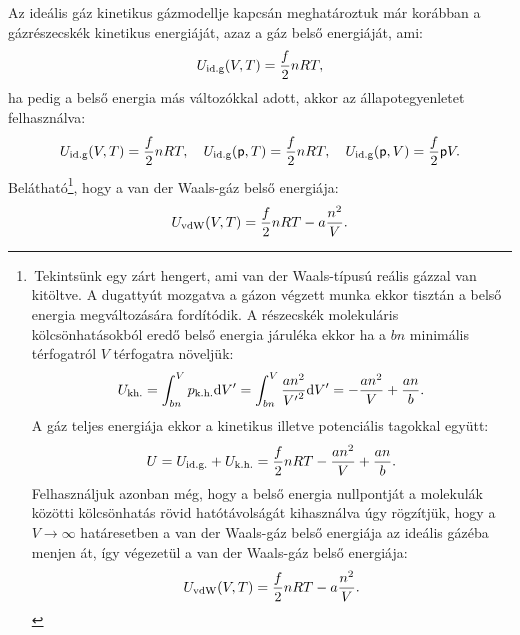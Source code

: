 Az ideális gáz kinetikus gázmodellje kapcsán meghatároztuk már korábban a gázrészecskék kinetikus energiáját, azaz a gáz belső energiáját, ami:
\begin{align}
    U_{\textnormal{id.g}}(V,T) = \frac f2 nRT,
\end{align}
ha pedig a belső energia más változókkal adott, akkor az állapotegyenletet felhasználva:
\begin{align}
    U_{\textnormal{id.g}}(V,T) = \frac f2 nRT,\quad U_{\textnormal{id.g}}(\mathsf p,T) = \frac f2 nRT,\quad  U_{\textnormal{id.g}}(\mathsf p,V) = \frac f2 \mathsf p V.
\end{align}
Belátható\footnote{\,Tekintsünk egy zárt hengert, ami van der Waals-típusú reális gázzal van kitöltve. A dugattyút mozgatva a gázon végzett munka ekkor tisztán a belső energia megváltozására fordítódik. A részecskék molekuláris kölcsönhatásokból eredő belső energia járuléka ekkor ha a $bn$ minimális térfogatról $V$ térfogatra növeljük:
\[U_{\textnormal{kh.}} = \int_{bn}^V p_{\textnormal{k.h.}}\mathrm{d}V' = \int_{bn}^V \frac{an^2}{{V'}^2}\mathrm{d}V' = -\frac{an^2}{V}+\frac{an}{b}.\]
A gáz teljes energiája ekkor a kinetikus illetve potenciális tagokkal együtt:
\[U = U_{\textnormal{id.g.}} + U_{\textnormal{k.h.}} = \frac f2 nRT -\frac{an^2}{V}+\frac{an}{b}.\]
Felhasználjuk azonban még, hogy a belső energia nullpontját a molekulák közötti kölcsönhatás rövid hatótávolságát kihasználva úgy rögzítjük, hogy a $V\to\infty$ határesetben a van der Waals-gáz belső energiája az ideális gázéba menjen át, így végezetül a van der Waals-gáz belső energiája:
\begin{align}
    U_{\textnormal{vdW}}(V,T) = \frac f2 nRT - a\frac{n^2}{V}.
\end{align}}, hogy a van der Waals-gáz belső energiája:
\begin{align}
    U_{\textnormal{vdW}}(V,T) = \frac f2 nRT - a\frac{n^2}{V}.
\end{align}

